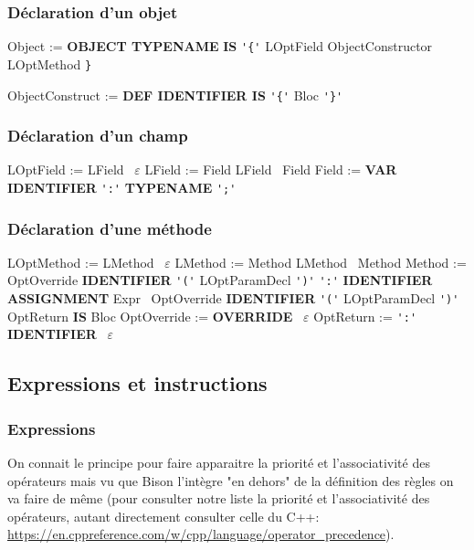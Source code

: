 \documentclass[12pt,a4paper]{article}
\begin{document}
\subsubsection{Déclaration d'un objet}

{\sffamily
Object := \textbf{OBJECT TYPENAME} \textbf{IS} \verb|'{'| LOptField ObjectConstructor LOptMethod \verb|}|

ObjectConstruct := \textbf{DEF IDENTIFIER IS} \verb|'{'| Bloc \verb|'}'|
}

\subsubsection{Déclaration d'un champ}

{\sffamily
LOptField := LField \textbar \ $\varepsilon$ \newline
LField := Field LField \textbar \ Field \newline
Field := \textbf{VAR IDENTIFIER} \verb|':'| \textbf{TYPENAME} \verb|';'|
}

\subsubsection{Déclaration d'une méthode}

{\sffamily\small
LOptMethod := LMethod \textbar \ $\varepsilon$ \newline
LMethod := Method LMethod \textbar \ Method \newline
Method := OptOverride \textbf{IDENTIFIER} \verb|'('| LOptParamDecl \verb|')'| \verb|':'| \textbf{IDENTIFIER ASSIGNMENT} Expr \newline
\hspace*{1em} \textbar \ OptOverride \textbf{IDENTIFIER} \verb|'('| LOptParamDecl \verb|')'| OptReturn \textbf{IS} Bloc \newline
OptOverride := \textbf{OVERRIDE} \textbar \ $\varepsilon$ \newline
OptReturn := \verb|':'| \textbf{IDENTIFIER} \textbar \ $\varepsilon$
}

\subsection{Expressions et instructions}

\subsubsection{Expressions}

On connait le principe pour faire apparaitre la priorité et l'associativité des opérateurs mais vu que Bison l'intègre "en dehors" de la définition des règles on va faire de même (pour consulter notre liste la priorité et l'associativité des opérateurs, autant directement consulter celle du C++: \url{https://en.cppreference.com/w/cpp/language/operator_precedence}).
\end{document}
